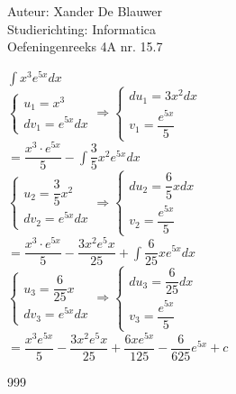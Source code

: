 \documentclass[a4paper]{article}
\begin{document}
\noindent \large Auteur: Xander De Blauwer \\
\noindent \large Studierichting: Informatica\\
\noindent \large Oefeningenreeks 4A nr. 15.7\\

\medskip

\normalsize

$\displaystyle\int x^3e^{5x}dx$\\

$\left \{
\begin{array}{l}
u_1 = x^3 \\
dv_1 = e^{5x}dx
\end{array}
\right .
\Rightarrow
\left \{
\begin{array}{l}
du_1 = 3x^2dx \\
v_1 = \dfrac{e^{5x}}{5}
\end{array}
\right .$\\

$=\dfrac{x^3 \cdot e^{5x}}{5} - \displaystyle\int \dfrac{3}{5}x^2e^{5x}dx$\\




$\left \{
\begin{array}{l}
u_2 = \dfrac{3}{5}x^2 \\
dv_2 = e^{5x}dx
\end{array}
\right .
\Rightarrow
\left \{
\begin{array}{l}
du_2 = \dfrac{6}{5}xdx \\
v_2 = \dfrac{e^{5x}}{5}
\end{array}
\right .$\\

$=\dfrac{x^3 \cdot e^{5x}}{5} -\dfrac{3x^2e^5x}{25} + \displaystyle\int \dfrac{6}{25}xe^{5x}dx$\\


$\left \{
\begin{array}{l}
u_3 = \dfrac{6}{25}x \\
dv_3 = e^{5x}dx
\end{array}
\right .
\Rightarrow
\left \{
\begin{array}{l}
du_3 = \dfrac{6}{25}dx \\
v_3 = \dfrac{e^{5x}}{5}
\end{array}
\right .$\\

$=\dfrac{x^3e^{5x}}{5} -\dfrac{3x^2e^5x}{25} + \dfrac{6xe^{5x}}{125} - \dfrac{6}{625}e^{5x} + c $\\






\begin{thebibliography}{999}
\end{thebibliography}
\end{document}
